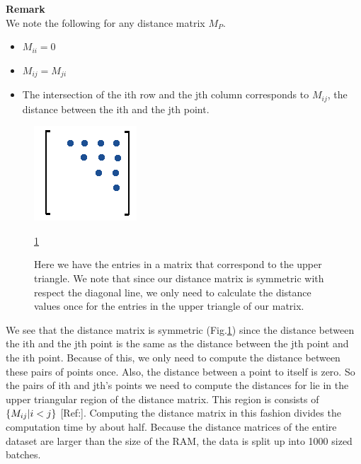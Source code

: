 \documentclass[12pt, a4paper, twocolumn, fullpage]{article}
\theoremstyle{plain}
\theoremstyle{definition}
\theoremstyle{remark}
\begin{document}
\noindent
\textbf{Remark}\\
We note the following for any distance matrix $M_{P}$.
    \begin{itemize}
        \item $M_{ii} = 0$
        \item $M_{ij} = M_{ji}$
        \item The intersection of the ith row and the jth column corresponds to $M_{ij}$, the distance between the ith and the jth point.
    \end{itemize}
    
\begin{figure}[h]
	\centering
    \includegraphics[width=.7\linewidth]{uptry.png}
    \caption{Here we have the entries in a matrix that correspond to the upper triangle. We note that since our distance matrix is symmetric with respect the diagonal line, we only need to calculate the distance values once for the entries in the upper triangle of our matrix.}
     \ref{uptry}
    \label{uptry}
\end{figure}
    

We see that the distance matrix is symmetric (Fig.\ref{uptry}) since the distance between the ith and the jth point is the same as the distance between the jth point and the ith point. Because of this, we only need to compute the distance between these pairs of points once. Also, the distance between a point to itself is zero. So the pairs of ith and jth's points we need to compute the distances for lie in the upper triangular region of the distance matrix. This region is consists of $\{ M_{ij} \space | \space i<j \}$ [Ref:]. Computing the distance matrix in this fashion divides the computation time by about half. Because the distance matrices of the entire dataset are larger than the size of the RAM, the data is split up into 1000 sized batches. 
\end{document}
